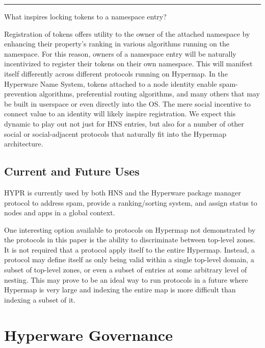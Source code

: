 \documentclass[runningheads]{llncs}
\begin{document}
\begin{center}
\noindent\rule{8cm}{0.4pt}
\end{center}

What inspires locking tokens to a namespace entry?

Registration of tokens offers utility to the owner of the attached namespace by enhancing their property's ranking in various algorithms running on the namespace.
For this reason, owners of a namespace entry will be naturally incentivized to register their tokens on their own namespace.
This will manifest itself differently across different protocols running on Hypermap.
In the Hyperware Name System, tokens attached to a node identity enable spam-prevention algorithms, preferential routing algorithms, and many others that may be built in userspace or even directly into the OS.
The mere social incentive to connect value to an identity will likely inspire registration.
We expect this dynamic to play out not just for HNS entries, but also for a number of other social or social-adjacent protocols that naturally fit into the Hypermap architecture.

\subsection{Current and Future Uses}
\label{sec:hypruses}

HYPR is currently used by both HNS and the Hyperware package manager protocol to address spam, provide a ranking/sorting system, and assign status to nodes and apps in a global context.

One interesting option available to protocols on Hypermap not demonstrated by the protocols in this paper is the ability to discriminate between top-level zones.
It is not required that a protocol apply itself to the entire Hypermap.
Instead, a protocol may define itself as only being valid within a single top-level domain, a subset of top-level zones, or even a subset of entries at some arbitrary level of nesting.
This may prove to be an ideal way to run protocols in a future where Hypermap is very large and indexing the entire map is more difficult than indexing a subset of it.

\section{Hyperware Governance}
\label{sec:governance}
\end{document}
